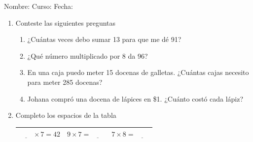 \documentclass[letterpaper,fleqn]{article}
\newcommand{\LineaNombre}{%
\par
\vspace{\baselineskip}
Nombre:\hrulefill \; Curso: \underline{\hspace*{48pt}} \; Fecha: \underline{\hspace*{2.5cm}} \relax
\par}
\begin{document}
\LineaNombre
\begin{enumerate}
\item Conteste las siguientes preguntas
\begin{enumerate}
  \item ¿Cu\'antas veces debo sumar 13 para que me d\'e 91?\underline{\hspace{2.5cm}}
  \item ¿Qu\'e n\'umero multiplicado por 8 da 96? \underline{\hspace{2.5cm}}
  \item En una caja puedo meter 15 docenas de galletas. ¿Cuántas cajas necesito para meter 285 docenas? \underline{\hspace{2.5cm}}
    \item Johana compr\'o una docena de l\'apices en \$1. ¿Cuánto costó cada lápiz? \underline{\hspace{2.5cm}}
\end{enumerate}
\item Completo los espacios de la tabla
\begin{center}
\begin{tabular}{c|c|c}
$ \underline{\qquad}\times7=42 $ & $ 9\times7=\underline{\qquad} $ & $ 7\times8=\underline{\qquad} $\\[5pt]\hline

\end{tabular}
\end{center}
\end{enumerate}
\end{document}
